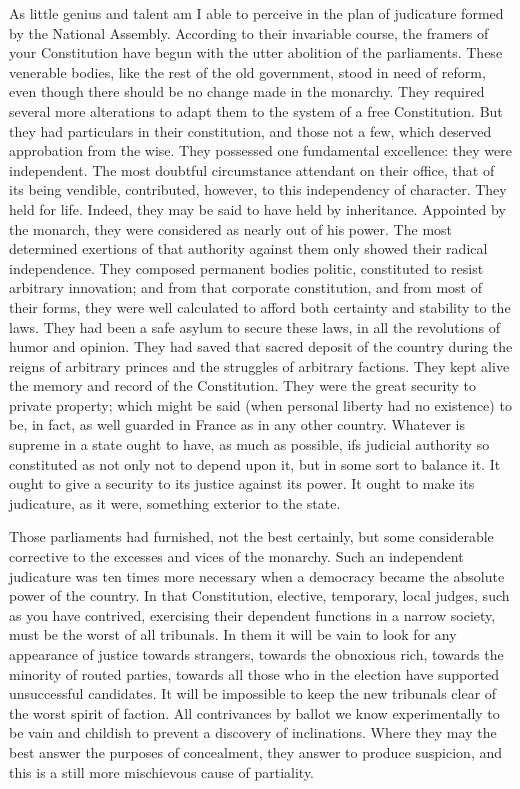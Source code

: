 As little genius and talent am I able to perceive in the plan of judicature formed by the National Assembly. According to their invariable course, the framers of your Constitution have begun with the utter abolition of the parliaments. These venerable bodies, like the rest of the old government, stood in need of reform, even though there should be no change made in the monarchy. They required several more alterations to adapt them to the system of a free Constitution. But they had particulars in their constitution, and those not a few, which deserved approbation from the wise. They possessed one fundamental excellence: they were independent. The most doubtful circumstance attendant on their office, that of its being vendible, contributed, however, to this independency of character. They held for life. Indeed, they may be said to have held by inheritance. Appointed by the monarch, they were considered as nearly out of his power. The most determined exertions of that authority against them only showed their radical independence. They composed permanent bodies politic, constituted to resist arbitrary innovation; and from that corporate constitution, and from most of their forms, they were well calculated to afford both certainty and stability to the laws. They had been a safe asylum to secure these laws, in all the revolutions of humor and opinion. They had saved that sacred deposit of the country during the reigns of arbitrary princes and the struggles of arbitrary factions. They kept alive the memory and record of the Constitution. They were the great security to private property; which might be said (when personal liberty had no existence) to be, in fact, as well guarded in France as in any other country. Whatever is supreme in a state ought to have, as much as possible, ifs judicial authority so constituted as not only not to depend upon it, but in some sort to balance it. It ought to give a security to its justice against its power. It ought to make its judicature, as it were, something exterior to the state.

Those parliaments had furnished, not the best certainly, but some considerable corrective to the excesses and vices of the monarchy. Such an independent judicature was ten times more necessary when a democracy became the absolute power of the country. In that Constitution, elective, temporary, local judges, such as you have contrived, exercising their dependent functions in a narrow society, must be the worst of all tribunals. In them it will be vain to look for any appearance of justice towards strangers, towards the obnoxious rich, towards the minority of routed parties, towards all those who in the election have supported unsuccessful candidates. It will be impossible to keep the new tribunals clear of the worst spirit of faction. All contrivances by ballot we know experimentally to be vain and childish to prevent a discovery of inclinations. Where they may the best answer the purposes of concealment, they answer to produce suspicion, and this is a still more mischievous cause of partiality.

